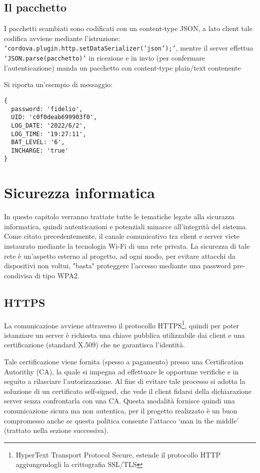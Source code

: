 \documentclass[target=bach]{thud}
\begin{document}
\section{Il pacchetto}
    I pacchetti scambiati sono codificati con un content-type JSON, a lato client tale codifica avviene mediante l'istruzione: \texttt{`cordova.plugin.http.setDataSerializer('json');'}, mentre il server effettua \texttt{`JSON.parse(pacchetto)'} in ricezione e in invio (per confermare l'autenticazione) manda un pacchetto con content-type plain/text contenente

    Si riporta un'esempio di messaggio:
\begin{lstlisting}
{
  password: 'fidelio',
  UID: 'c0f0deab699903f0',
  LOG_DATE: '2022/6/2',
  LOG_TIME: '19:27:11',
  BAT_LEVEL: '6',
  INCHARGE: 'true'
}
\end{lstlisting}

\chapter{Sicurezza informatica}
In questo capitolo verranno trattate tutte le tematiche legate alla sicurazza informatica, quindi autenticazioni e potenziali minacce all'integrità del sistema.
Come citato precedentemente, il canale comunicativo tra client e server viete instaurato mediante la tecnologia Wi-Fi di una rete privata.
La sicurezza di tale rete è un'aspetto esterno al progetto, ad ogni modo, per evitare attacchi da dispositivi non voltui, "basta" proteggere l'accesso mediante una password pre-condivisa di tipo WPA2.

\section{HTTPS}

    La comunicazione avviene attraverso il protocollo HTTPS\footnote[1]{HyperText Transport Protocol Secure, estende il protocollo HTTP aggiungendogli la crittografia SSL/TLS}, quindi per poter istanziare un server è richiesta una chiave pubblica utilizzabile dai client e una certificazione (standard X.509) che ne garantisca l'identità.

    Tale certificazione viene fornita (spesso a pagamento) presso una Certification Autorithy (CA), la quale si impegna ad effettuare le opportune verifiche e in seguito a rilasciare l'autorizzazione. Al fine di evitare tale processo si adotta la soluzione di un certificato self-signed, che vede il client fidarsi della dichiarazione server senza confrontarla con una CA.
    Questa modalità fornisce quindi una comunicazione sicura ma non autentica, per il progetto realizzato è un buon compromesso anche se questa politica consente l'attacco `man in the middle' (trattato nella sezione successiva).
\end{document}
